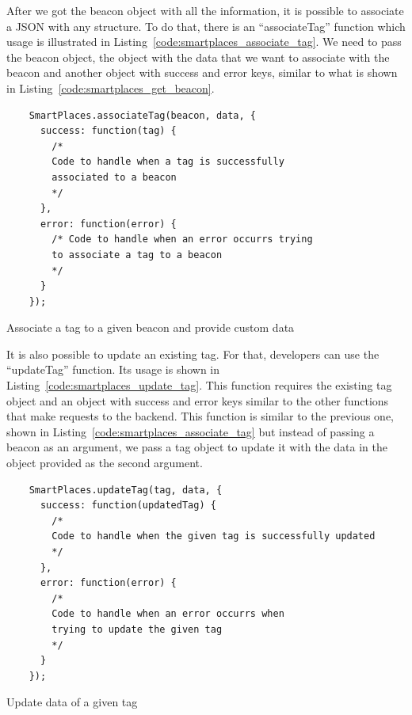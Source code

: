 After we got the beacon object with all the information, it is possible to associate a \gls{JSON} with any structure.
To do that, there is an ``associateTag'' function which usage is illustrated in Listing~\ref{code:smartplaces_associate_tag}.
We need to pass the beacon object, the object with the data that we want to associate with the beacon and another object with success and error keys, similar to what is shown in Listing~\ref{code:smartplaces_get_beacon}.

\begin{listing}[H]
  \begin{verbatim}
    SmartPlaces.associateTag(beacon, data, {
      success: function(tag) {
        /*
        Code to handle when a tag is successfully
        associated to a beacon
        */
      },
      error: function(error) {
        /* Code to handle when an error occurrs trying
        to associate a tag to a beacon
        */
      }
    });
  \end{verbatim}
  \caption[Associate tag]{Associate a tag to a given beacon and provide custom data}
  \label{code:smartplaces_associate_tag}
\end{listing}

It is also possible to update an existing tag.
For that, developers can use the ``updateTag'' function.
Its usage is shown in Listing~\ref{code:smartplaces_update_tag}.
This function requires the existing tag object and an object with success and error keys similar to the other functions that make requests to the backend.
This function is similar to the previous one, shown in Listing~\ref{code:smartplaces_associate_tag} but instead of passing a beacon as an argument, we pass a tag object to update it with the data in the object provided as the second argument.

\begin{listing}[H]
  \begin{verbatim}
    SmartPlaces.updateTag(tag, data, {
      success: function(updatedTag) {
        /*
        Code to handle when the given tag is successfully updated
        */
      },
      error: function(error) {
        /*
        Code to handle when an error occurrs when
        trying to update the given tag
        */
      }
    });
  \end{verbatim}
  \caption[Update an existing tag]{Update data of a given tag}
  \label{code:smartplaces_update_tag}
\end{listing}


